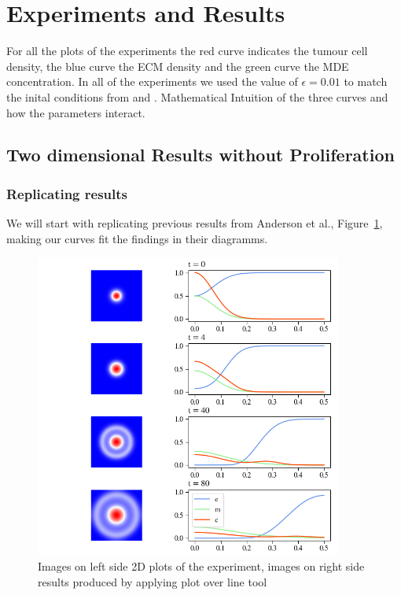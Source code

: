 

\section{Experiments and Results}
For all the plots of the experiments the red curve indicates the tumour cell density, the blue curve the ECM density and the green curve the MDE concentration. In all of the experiments we used the value of $\epsilon = 0.01$ to match the inital conditions from \cite{anderson_mathematical_2000} and \cite{Kolev2010}. \newline 
Mathematical Intuition of the three curves and how the parameters interact.


\subsection{Two dimensional Results without Proliferation}
\subsubsection{Replicating results}
We will start with replicating previous results from Anderson et al.\cite{anderson_mathematical_2000}, Figure~\ref{fig:2D_1e-3_1e-3_1e-3_10_0.1_0_0.005}, making our curves fit the findings in their diagramms. 


\begin{figure}[h]
    \centering
    \includegraphics[width=0.9\textwidth]{resources/images/first_replication_results.png}
    \caption{Images on left side 2D plots of the experiment, images on right side results produced by applying plot over line tool}
    \label{fig:2D_1e-3_1e-3_1e-3_10_0.1_0_0.005}
\end{figure}


